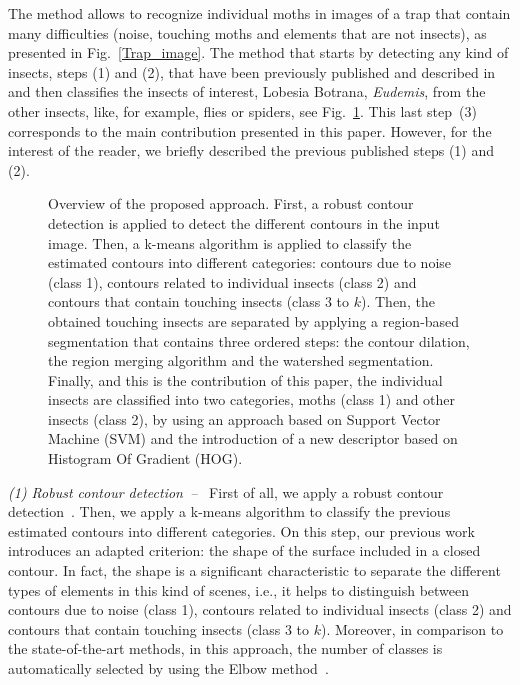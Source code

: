\documentclass[a4paper,conference]{IEEEtran}
\begin{document}
The method allows to recognize individual moths in images of a trap that contain many difficulties (noise, touching moths and elements that are not insects), as presented in Fig.~\ref{Trap_image}. The method that starts by detecting any kind of insects, steps (1) and (2), that have been previously published and described in~\cite{bakkay2017automatic} and  then classifies the insects of interest, Lobesia Botrana, \textit{Eudemis}, from the other insects, like, for example, flies or spiders, see Fig.~\ref{flowchart}. This last step~(3) corresponds to the main contribution presented in this paper. However, for the interest of the reader, we briefly described the previous published steps (1) and (2). 

\begin{figure}[!ht]
\caption{Overview of the proposed approach. First, a robust contour detection is applied to detect the different contours in the input image. Then, a k-means algorithm is applied to classify the estimated contours into different categories: contours due to noise (class 1), contours related to individual insects (class 2) and contours that contain touching insects (class 3 to $k$). Then, the obtained touching insects are separated by applying a region-based segmentation that contains three ordered steps: the contour dilation, the region merging algorithm and the watershed segmentation. Finally, and this is the contribution of this paper, the individual insects are classified into two categories, moths (class 1) and other insects (class 2), by using an approach based on Support Vector Machine (SVM) and the introduction of a new descriptor based on Histogram Of Gradient (HOG).}
\label{flowchart}
\end{figure}

\textit{(1) Robust contour detection~--~} 
First of all, we apply a robust contour detection~\cite{7532314}.  %
Then, we apply a k-means algorithm to classify the previous estimated contours into different categories. On this step, our previous work introduces an adapted criterion: the shape of the surface included in a closed contour. In fact, the shape is a significant characteristic to separate the different types of elements in this kind of scenes, i.e., it helps to distinguish between contours due to noise (class 1), contours related to individual insects (class 2) and contours that contain touching insects (class 3 to $k$). Moreover, in comparison to the state-of-the-art methods, in this approach, the number of classes is automatically selected by using the Elbow method~\cite{tibshirani2001estimating}. 
\end{document}
